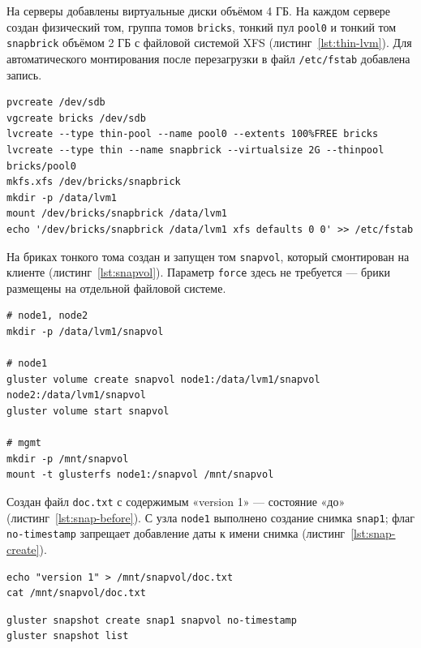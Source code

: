 На серверы добавлены виртуальные диски объёмом 4 ГБ. На каждом
сервере создан физический том, группа томов \texttt{bricks},
тонкий пул \texttt{pool0} и тонкий том \texttt{snapbrick} объёмом
2 ГБ с файловой системой XFS (листинг~\ref{lst:thin-lvm}). 
Для автоматического монтирования
после перезагрузки в файл \texttt{/etc/fstab} добавлена запись.

\begin{lstlisting}[caption={Развертывание thin LVM (node1, node2)}, label={lst:thin-lvm}]
pvcreate /dev/sdb
vgcreate bricks /dev/sdb
lvcreate --type thin-pool --name pool0 --extents 100%FREE bricks
lvcreate --type thin --name snapbrick --virtualsize 2G --thinpool bricks/pool0
mkfs.xfs /dev/bricks/snapbrick
mkdir -p /data/lvm1
mount /dev/bricks/snapbrick /data/lvm1
echo '/dev/bricks/snapbrick /data/lvm1 xfs defaults 0 0' >> /etc/fstab
\end{lstlisting}

На бриках тонкого тома создан и запущен том \texttt{snapvol},
который смонтирован на клиенте (листинг~\ref{lst:snapvol}).
Параметр \texttt{force} здесь не требуется --- брики размещены
на отдельной файловой системе.

\begin{lstlisting}[caption={Создание тома snapvol и монтирование (node1, node2, mgmt)}, label={lst:snapvol}]
# node1, node2
mkdir -p /data/lvm1/snapvol

# node1
gluster volume create snapvol node1:/data/lvm1/snapvol node2:/data/lvm1/snapvol
gluster volume start snapvol

# mgmt
mkdir -p /mnt/snapvol
mount -t glusterfs node1:/snapvol /mnt/snapvol
\end{lstlisting}

Создан файл \texttt{doc.txt} с содержимым «version 1» --- состояние
«до» (листинг~\ref{lst:snap-before}). С узла \texttt{node1}
выполнено создание снимка \texttt{snap1}; флаг \texttt{no-timestamp}
запрещает добавление даты к имени снимка
(листинг~\ref{lst:snap-create}).

\begin{lstlisting}[caption={Состояние "до" (mgmt)}, label={lst:snap-before}]
echo "version 1" > /mnt/snapvol/doc.txt
cat /mnt/snapvol/doc.txt
\end{lstlisting}

\begin{lstlisting}[caption={Создание снимка (node1)}, label={lst:snap-create}]
gluster snapshot create snap1 snapvol no-timestamp
gluster snapshot list
\end{lstlisting}

